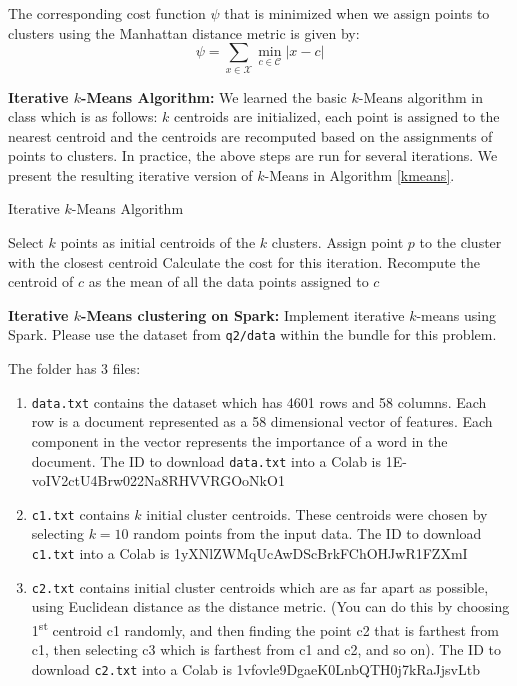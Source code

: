 The corresponding cost function $\psi$ that is minimized when we assign points to clusters using the Manhattan distance metric is given by:
\begin{equation}\label{eqn:cmd}
\psi = \sum_{x\in \mathcal{X}} \min_{c\in\mathcal{C}} |x - c|
\end{equation}

\textbf{Iterative $k$-Means Algorithm:} 
We learned the basic $k$-Means algorithm in class which is as follows: $k$ centroids are initialized, each point is assigned to the nearest centroid and the centroids are recomputed based on the assignments of points to clusters. In practice, the above steps are run for several iterations.  We present the resulting iterative version of $k$-Means in Algorithm \ref{kmeans}.
\begin{algorithm}
\small
\caption{Iterative $k$-Means Algorithm}
\label{kmeans}
\begin{algorithmic}[1]
\State Select $k$ points as initial centroids of the $k$ clusters. 
\State Assign point $p$ to the cluster with the closest centroid
\EndFor
\State Calculate the cost for this iteration.
\State Recompute the centroid of $c$ as the mean of all the data points assigned to $c$
\EndFor
\EndFor
\EndProcedure
\end{algorithmic}
\end{algorithm}

\textbf{Iterative $k$-Means clustering on Spark:} Implement iterative $k$-means
using Spark. Please use the dataset from \texttt{q2/data} within the bundle for this problem.

The folder has 3 files:
\begin{enumerate}
\item \texttt{data.txt} contains the dataset which has 4601 rows and 58
columns.
Each row is a document represented as a 58 dimensional vector of features. Each
component in the vector represents the importance of a word in the document. The ID to download \texttt{data.txt} into a Colab is 1E-voIV2ctU4Brw022Na8RHVVRGOoNkO1
\item \texttt{c1.txt} contains $k$ initial cluster centroids. These centroids were
chosen by selecting $k = 10$ random points from the input data. The ID to download \texttt{c1.txt} into a Colab is 1yXNlZWMqUcAwDScBrkFChOHJwR1FZXmI
\item \texttt{c2.txt} contains initial cluster centroids which are as far apart
as possible, using Euclidean distance as the distance metric. (You can do this by choosing 1\textsuperscript{st} centroid c1 randomly, and then finding the point c2 that is farthest from c1, then selecting c3 which is farthest from c1 and c2, and so on). The ID to download \texttt{c2.txt} into a Colab is 1vfovle9DgaeK0LnbQTH0j7kRaJjsvLtb
\end{enumerate}

